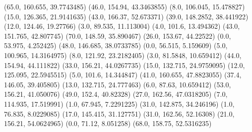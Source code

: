 {(65.0, 160.655, 39.7743485) (46.0, 154.94, 43.3463855) (8.0, 106.045, 15.478827) (15.0, 126.365, 21.9141635) (43.0, 166.37, 52.673371) (39.0, 148.2852, 38.441922) (12.0, 124.46, 19.27766) (3.0, 89.535, 11.113004) (4.0, 101.6, 13.494362) (43.0, 151.765, 42.807745) (70.0, 148.59, 35.890467) (26.0, 153.67, 44.22522) (0.0, 53.975, 4.252425) (48.0, 146.685, 38.0733785) (0.0, 56.515, 5.159609) (5.0, 100.965, 14.3164975) (8.0, 121.92, 23.2182405) (3.0, 81.5848, 10.659412) (44.0, 154.94, 44.111822) (33.0, 156.21, 44.0267735) (15.0, 132.715, 24.9759095) (12.0, 125.095, 22.5945515) (5.0, 101.6, 14.344847) (41.0, 160.655, 47.8823055) (37.4, 146.05, 39.405805) (13.0, 132.715, 24.777463) (6.0, 87.63, 10.659412) (53.0, 156.21, 41.050076) (49.0, 152.4, 40.82328) (27.0, 162.56, 47.0318205) (7.0, 114.935, 17.519991) (1.0, 67.945, 7.2291225) (31.0, 142.875, 34.246196) (1.0, 76.835, 8.0229085) (17.0, 145.415, 31.127751) (31.0, 162.56, 52.16308) (21.0, 156.21, 54.0624965) (0.0, 71.12, 8.051258) (68.0, 158.75, 52.5316235)
                }